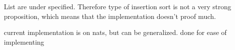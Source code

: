 List are under specified. 
Therefore type of insertion sort is not a very strong proposition, which means that the implementation doesn't proof much.

current implementation is on nats, but can be generalized. done for ease of implementing
